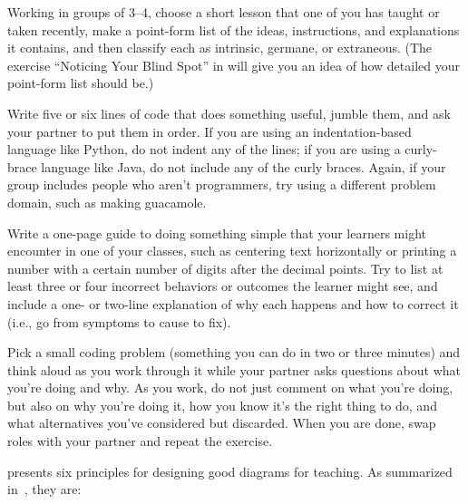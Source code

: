 
Working in groups of 3--4, choose a short lesson that one of you has
taught or taken recently, make a point-form list of the ideas,
instructions, and explanations it contains, and then classify each as
intrinsic, germane, or extraneous. (The exercise ``Noticing Your Blind
Spot'' in  will give you an idea of how
detailed your point-form list should be.)


Write five or six lines of code that does something useful, jumble them,
and ask your partner to put them in order. If you are using an
indentation-based language like Python, do not indent any of the lines;
if you are using a curly-brace language like Java, do not include any of
the curly braces. Again, if your group includes people who aren't
programmers, try using a different problem domain, such as making
guacamole.


Write a one-page guide to doing something simple that your learners
might encounter in one of your classes, such as centering text
horizontally or printing a number with a certain number of digits after
the decimal points. Try to list at least three or four incorrect
behaviors or outcomes the learner might see, and include a one- or
two-line explanation of why each happens and how to correct it (i.e., go
from symptoms to cause to fix).


Pick a small coding problem (something you can do in two or three
minutes) and think aloud as you work through it while your partner asks
questions about what you're doing and why. As you work, do not just
comment on what you're doing, but also on why you're doing it, how you
know it's the right thing to do, and what alternatives you've considered
but discarded. When you are done, swap roles with your partner and
repeat the exercise.


\cite{Maye2009} presents six principles for designing good diagrams
for teaching. As summarized in~\cite{Mill2016a}, they are:

